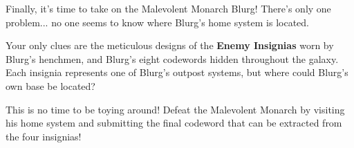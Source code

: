 Finally, it's time to take on the Malevolent Monarch Blurg!
There's only one problem... no one seems to know where Blurg's
home system is located.

Your only clues are the meticulous designs of the
\textbf{Enemy Insignias} worn by Blurg's henchmen,
and Blurg's eight codewords hidden throughout the galaxy.
Each insignia represents one of Blurg's outpost systems,
but where could Blurg's own base be located?

This is no time to be toying around! Defeat the Malevolent Monarch
by visiting his home system and submitting the final
codeword that can be extracted from the four insignias!
